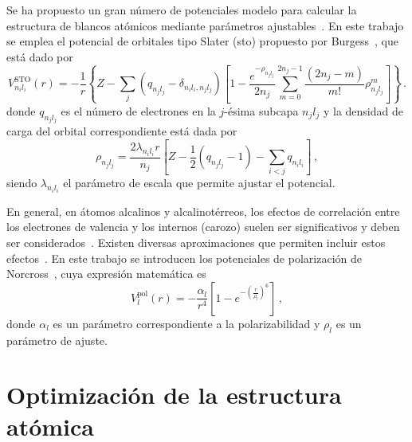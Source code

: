 Se ha propuesto un gran número de potenciales modelo para calcular la 
estructura de blancos atómicos mediante parámetros 
ajustables~\cite{Hibbert:82,Gombas:56,Green:69,Klapisch:71,Phillips:59,
Herman:63,Dalgarno:70,Bayliss:77,Cowan:76,Lee:77}. En este trabajo se 
emplea el potencial de orbitales tipo Slater (\acs{sto}) propuesto por 
Burgess~\cite{Burgess:89}, que está dado por
\begin{equation}
V_{n_il_i}^{\textrm{STO}}(r)=-\frac{1}{r}\left\{Z-\sum_j(q_{n_jl_j}-
\delta_{n_il_i,n_jl_j})
\left[1-\frac{e^{-\rho_{n_jl_j}}}{2n_j}\sum_{m=0}^{2n_j-1}
\frac{(2n_j-m)}{m!}\rho_{n_jl_j}^m\right]\right\}\,.
\label{eq:STO-pot}
\end{equation}
donde $q_{n_jl_j}$ es el número de electrones en la $j$-ésima subcapa 
$n_jl_j$ y la densidad de carga del orbital correspondiente está dada 
por
\begin{equation}
\rho_{n_jl_j}= \frac{2\lambda_{n_il_i}r}{n_j}\left[Z-
\frac{1}{2}\left(q_{n_jl_j}-1\right)-\sum_{i<j} q_{n_il_i}\right]\,,
\end{equation}
siendo $\lambda_{n_il_i}$ el parámetro de escala que permite ajustar el 
potencial. 

En general, en átomos alcalinos y alcalinotérreos, los efectos de 
correlación entre los electrones de valencia y los internos 
(carozo) suelen ser significativos y deben ser 
considerados~\cite{Bartschat:04,Muller:83}. Existen diversas 
aproximaciones que permiten incluir estos efectos~\cite{Loughlin:88,
Seaton:72,Loughlin:73,Migdalek:78}. En este trabajo se introducen los
potenciales de polarización de Norcross~\cite{Norcross:76}, cuya 
expresión matemática es
\begin{equation}
 V_l^{\textrm{pol}}(r) = -\frac{\alpha_l}{r^4}\left[1-
e^{-\left(\tfrac{r}{\rho_l}\right)^6}\right]\,,
\label{eq:Norcross-pot}
\end{equation}
donde $\alpha_l$ es un parámetro correspondiente a la polarizabilidad y 
$\rho_l$ es un parámetro de ajuste.

\section{Optimización de la estructura atómica}
\label{sec:optproblems}

